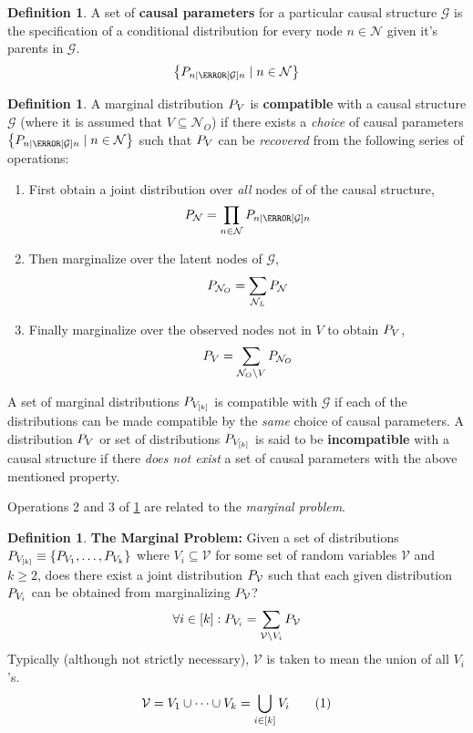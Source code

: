 \documentclass[aps, 10pt, english, twoside, pra, nofootinbib, longbibliography]{revtex4-1}
\theoremstyle{plain}
\theoremstyle{definition}
\newtheorem{definition}[theorem]{Definition}
\theoremstyle{remark}
\newcommand{\graph}{\mathcal{G}}
\newcommand{\nodes}{\mathcal{N}}
\newcommand{\term}[1]{\textcolor{Mahogany}{\textbf{#1}}}
\begin{document}
    \begin{definition}
        A set of \term{causal parameters} for a particular causal structure $\graph$ is the specification of a conditional distribution for every node $n \in \nodes$ given it's parents in $\graph$.
        \[ \bc{\prob[n \mid \Pa[\graph]{n}] \mid n \in \nodes} \]
    \end{definition}
    \begin{definition}
        \label{def:compatible}
        A marginal distribution $\prob[V]$ is \term{compatible} with a causal structure $\graph$ (where it is assumed that $V \subseteq \nodes_O$) if there exists a \textit{choice} of causal parameters $\bc{\prob[n \mid \Pa[\graph]{n}] \mid n \in \nodes}$ such that $\prob[V]$ can be \textit{recovered} from the following series of operations:
        \begin{enumerate}
            \item First obtain a joint distribution over \textit{all} nodes of of the causal structure,
            \[ \prob[\nodes] = \prod_{n \in \nodes} \prob[n \mid \Pa[\graph]{n}] \]
            \item Then marginalize over the latent nodes of $\graph$,
            \[ \prob[\nodes_O] = \sum_{\nodes_L} \prob[\nodes] \]
            \item Finally marginalize over the observed nodes not in $V$ to obtain $\prob[V]$,
            \[ \prob[V] = \sum_{\nodes_O \setminus V} \prob[\nodes_O] \]
        \end{enumerate}
        A set of marginal distributions $\prob[V_{\bs{k}}]$ is compatible with $\graph$ if each of the distributions can be made compatible by the \textit{same} choice of causal parameters.
        A distribution $\prob[V]$ or set of distributions $\prob[V_{\bs{k}}]$ is said to be \term{incompatible} with a causal structure if there \textit{does not exist} a set of causal parameters with the above mentioned property.

    \end{definition}
    Operations 2 and 3 of \cref{def:compatible} are related to the \textit{marginal problem}.
    \begin{definition}
        \label{def:marginal_problem}
        \term{The Marginal Problem:} Given a set of distributions $\prob[V_{\bs{k}}] \defined \bc{\prob[V_1], \ldots, \prob[V_k]}$ where $V_i \subseteq \mathcal{V}$ for some set of random variables $\mathcal{V}$ and $k \geq 2$, does there exist a joint distribution $\prob[\mathcal{V}]$ such that each given distribution $\prob[V_i]$ can be obtained from marginalizing $\prob[\mathcal{V}]$?
        \[ \forall i \in \bs{k} : \prob[V_i] = \sum_{\mathcal{V} \setminus V_i} \prob[\mathcal{V}] \]
        Typically (although not strictly necessary), $\mathcal{V}$ is taken to mean the union of all $V_i$'s.
        \[ \mathcal{V} = V_1 \cup \cdots \cup V_k = \bigcup_{i\in\bs{k}} V_i \eq \label{eq:marginals_union} \]
    \end{definition}
\end{document}
